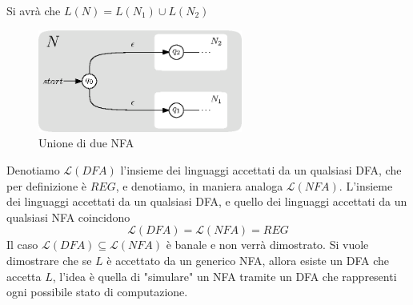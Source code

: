 \documentclass[10pt, letterpaper]{report}
\begin{document}
Si avrà che $L(N)=L(N_1)\cup L(N_2)$\begin{center}
    \begin{figure}[h!]
        \centering 
        \includegraphics[width=0.6\textwidth ]{images/UnioneNFA.eps}
        \caption{Unione di due NFA}
        \label{fig:NFAUnion}
    \end{figure}
\end{center}
Denotiamo $\mathcal{L}(DFA)$ l'insieme dei linguaggi accettati da un qualsiasi DFA, che per definizione è $REG$, e denotiamo, in maniera analoga 
$\mathcal{L}(NFA)$. \acc 
\teo{}  L'insieme dei linguaggi accettati da un qualsiasi DFA, e quello dei linguaggi accettati 
da un qualsiasi NFA coincidono $$\mathcal{L}(DFA)=\mathcal{L}(NFA)=REG$$
\dimo{} Il caso $\mathcal{L}(DFA)\subseteq\mathcal{L}(NFA)$ è banale e non verrà dimostrato. Si vuole dimostrare che 
se $L$ è accettato da un generico NFA, allora esiste un DFA che accetta $L$, l'idea è quella di "simulare" un NFA 
tramite un DFA che rappresenti ogni possibile stato di computazione.
\end{document}
